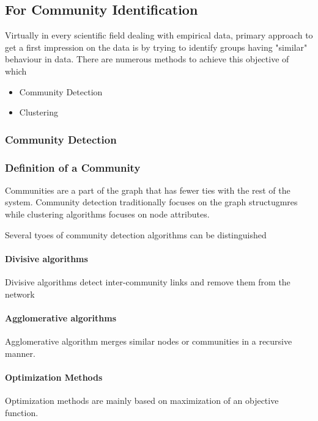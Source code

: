 \subsection{For Community Identification}
Virtually in every scientific field dealing with empirical data, primary approach to get a first impression on the data is by trying to identify groups having "similar" behaviour in data. There are numerous methods to achieve this objective of which 

\begin{itemize}
\item Community Detection
\item Clustering
\end{itemize}

\subsubsection{Community Detection}
\subsubsection{Definition of a Community}
Communities are a part of the graph that has fewer ties with the rest of the system. Community detection traditionally focuses on the graph structugmres while clustering algorithms focuses on node attributes. 

Several tyoes of community detection algorithms can be distinguished
\paragraph{Divisive algorithms}
Divisive algorithms detect inter-community links and remove them from the network

\paragraph{Agglomerative algorithms}
Agglomerative algorithm merges similar nodes or communities in a recursive manner.

\paragraph{Optimization Methods}
Optimization methods are mainly based on maximization of an objective function.




